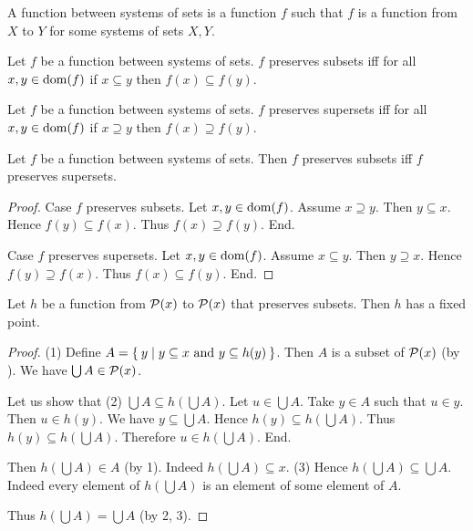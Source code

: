 \documentclass[../../set-theory.ftl.tex]{subfiles}
\begin{document}
  \begin{forthel}
    \begin{definition}
      A function between systems of sets is a function $f$ such that $f$ is a function from $X$ to $Y$ for some systems of sets $X, Y$.
    \end{definition}

    \begin{definition}
      Let $f$ be a function between systems of sets.
      $f$ preserves subsets iff for all $x,y \in \operatorname{dom}(f)$ if $x \subseteq y$ then $f(x) \subseteq f(y)$.
    \end{definition}

    \begin{definition}
      Let $f$ be a function between systems of sets.
      $f$ preserves supersets iff for all $x,y \in \operatorname{dom}(f)$ if $x \supseteq y$ then $f(x) \supseteq f(y)$.
    \end{definition}

    \begin{lemma}
      Let $f$ be a function between systems of sets.
      Then $f$ preserves subsets iff $f$ preserves supersets.
    \end{lemma}
    \begin{proof}
      Case $f$ preserves subsets.
        Let $x,y \in \operatorname{dom}(f)$.
        Assume $x \supseteq y$.
        Then $y \subseteq x$.
        Hence $f(y) \subseteq f(x)$.
        Thus $f(x) \supseteq f(y)$.
      End.

      Case $f$ preserves supersets.
        Let $x,y \in \operatorname{dom}(f)$.
        Assume $x \subseteq y$.
        Then $y \supseteq x$.
        Hence $f(y) \supseteq f(x)$.
        Thus $f(x) \subseteq f(y)$.
      End.
    \end{proof}

    \begin{theorem}\label{SetTheory_02_05_636019}
      Let $h$ be a function from $\mathcal{P}(x)$ to $\mathcal{P}(x)$ that preserves subsets.
      Then $h$ has a fixed point.
    \end{theorem}
    \begin{proof}
      (1) Define $A = \Set{y | \text{$y \subseteq x$ and $y \subseteq h(y)$}}$.
      Then $A$ is a subset of $\mathcal{P}(x)$ (by ).
      We have $\bigcup A \in \mathcal{P}(x)$.

      Let us show that (2) $\bigcup A \subseteq h(\bigcup A)$.
        Let $u \in \bigcup A$.
        Take $y \in A$ such that $u \in y$.
        Then $u \in h(y)$.
        We have $y \subseteq \bigcup A$.
        Hence $h(y) \subseteq h(\bigcup A)$.
        Thus $h(y) \subseteq h(\bigcup A)$.
        Therefore $u \in h(\bigcup A)$.
      End.

      Then $h(\bigcup A) \in A$ (by 1).
      Indeed $h(\bigcup A) \subseteq x$.
      (3) Hence $h(\bigcup A) \subseteq \bigcup A$.
      Indeed every element of $h(\bigcup A)$ is an element of some element of $A$.

      Thus $h(\bigcup A) = \bigcup A$ (by 2, 3).
    \end{proof}
  \end{forthel}
\end{document}
